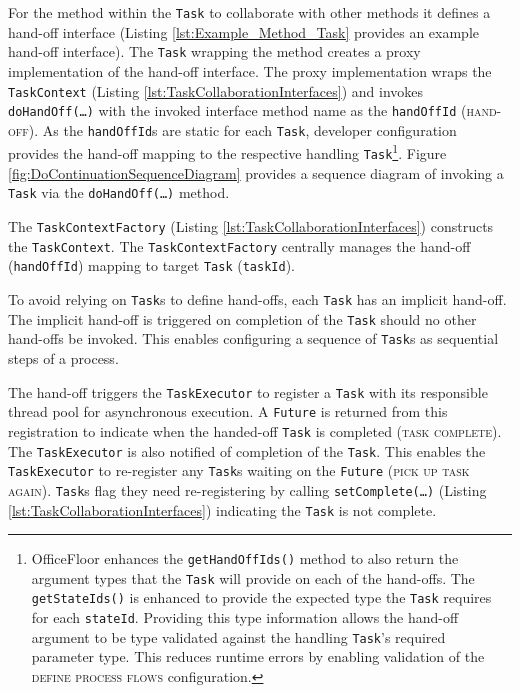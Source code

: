 \documentclass[prodmode]{style/acmlarge}
\begin{document}
For the method within the \texttt{Task} to collaborate with other methods it
defines a hand-off interface (Listing \ref{lst:Example_Method_Task} provides an
example hand-off interface).  The \texttt{Task} wrapping the method creates a
proxy implementation of the hand-off interface.  The proxy implementation wraps
the \texttt{TaskContext} (Listing \ref{lst:TaskCollaborationInterfaces}) and
invokes \texttt{doHandOff(\ldots)} with the invoked interface method name as the
\texttt{handOffId} (\textsc{hand-off}).  As the \texttt{handOffId}s are static
for each \texttt{Task}, developer configuration provides the hand-off mapping to
the respective handling \texttt{Task}\footnote{OfficeFloor enhances the
\texttt{getHandOffIds()} method to also return the argument types that the
\texttt{Task} will provide on each of the hand-offs.  The \texttt{getStateIds()}
is enhanced to provide the expected type the \texttt{Task} requires for each
\texttt{stateId}. Providing this type information allows the hand-off argument
to be type validated against the handling \texttt{Task}'s required parameter
type.  This reduces runtime errors by enabling validation of the \textsc{define
process flows} configuration.}.  Figure \ref{fig:DoContinuationSequenceDiagram}
provides a sequence diagram of invoking a \texttt{Task} via the
\texttt{doHandOff(\ldots)} method.

The \texttt{TaskContextFactory} (Listing \ref{lst:TaskCollaborationInterfaces})
constructs the \texttt{TaskContext}.  The \texttt{TaskContextFactory} centrally
manages the hand-off (\texttt{handOffId}) mapping to target \texttt{Task}
(\texttt{taskId}).

To avoid relying on \texttt{Task}s to define hand-offs, each \texttt{Task} has
an implicit hand-off.  The implicit hand-off is triggered on completion of the
\texttt{Task} should no other hand-offs be invoked.  This enables configuring a
sequence of \texttt{Task}s as sequential steps of a process.

The hand-off triggers the \texttt{TaskExecutor} to register a \texttt{Task} with
its responsible thread pool for asynchronous execution.  A \texttt{Future} is
returned from this registration to indicate when the handed-off \texttt{Task} is
completed (\textsc{task complete}).  The \texttt{TaskExecutor} is also notified
of completion of the \texttt{Task}.  This enables the \texttt{TaskExecutor} to
re-register any \texttt{Task}s waiting on the \texttt{Future} (\textsc{pick up
task again}).  \texttt{Task}s flag they need re-registering by calling
\texttt{setComplete(\ldots)} (Listing \ref{lst:TaskCollaborationInterfaces})
indicating the \texttt{Task} is not complete.
\end{document}

